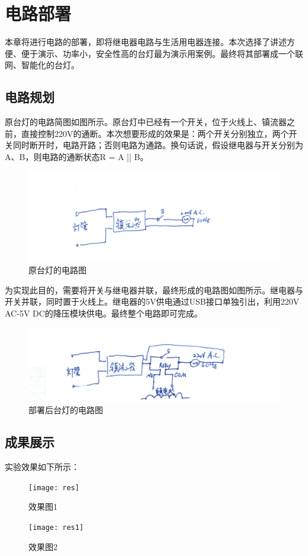 \setchapterpreamble[u]{\margintoc}
\chapter{电路部署}

\setlength\parindent{2em} 本章将进行电路的部署，即将继电器电路与生活用电器连接。本次选择了讲述方便、便于演示、功率小，安全性高的台灯最为演示用案例。最终将其部署成一个联网、智能化的台灯。

\section{电路规划}

\setlength\parindent{2em} 原台灯的电路简图如图所示。原台灯中已经有一个开关，位于火线上、镇流器之前，直接控制220V的通断。本次想要形成的效果是：两个开关分别独立，两个开关同时断开时，电路开路；否则电路为通路。换句话说，假设继电器与开关分别为A、B，则电路的通断状态R = A || B。

\begin{figure}[h!]
	\includegraphics[width=\textwidth]{lightori}
	\caption[lightori]{原台灯的电路图}
\end{figure}

\par 为实现此目的，需要将开关与继电器并联，最终形成的电路图如图所示。继电器与开关并联，同时置于火线上。继电器的5V供电通过USB接口单独引出，利用220V AC-5V DC的降压模块供电。最终整个电路即可完成。

\begin{figure}[h!]
	\includegraphics[width=\textwidth]{light}
	\caption[light]{部署后台灯的电路图}
\end{figure}

\section{成果展示}
\setlength\parindent{2em} 实验效果如下所示：

\begin{figure}[h!]
	\texttt{[image: res]}
	\caption[res]{效果图1}
\end{figure}

\begin{figure}[h!]
	\texttt{[image: res1]}
	\caption[res1]{效果图2}
\end{figure}
